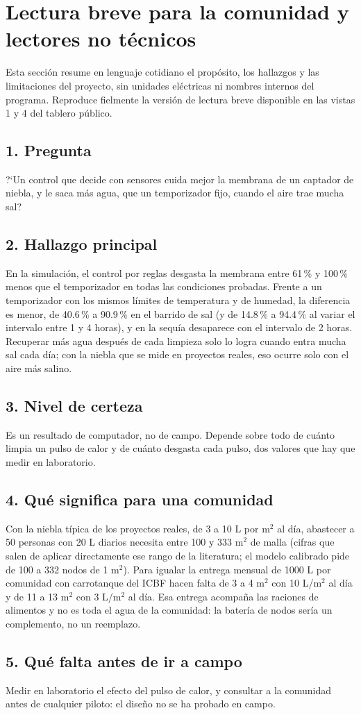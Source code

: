 \chapter*{Lectura breve para la comunidad y lectores no t\'ecnicos}

Esta secci\'on resume en lenguaje cotidiano el prop\'osito, los hallazgos y las limitaciones del proyecto, sin unidades el\'ectricas ni nombres internos del programa. Reproduce fielmente la versi\'on de lectura breve disponible en las vistas 1 y 4 del tablero p\'ublico.

\section*{1. Pregunta}
?`Un control que decide con sensores cuida mejor la membrana de un captador de niebla, y le saca m\'as agua, que un temporizador fijo, cuando el aire trae mucha sal?

\section*{2. Hallazgo principal}
En la simulaci\'on, el control por reglas desgasta la membrana entre 61\,\% y 100\,\% menos que el temporizador en todas las condiciones probadas. Frente a un temporizador con los mismos l\'imites de temperatura y de humedad, la diferencia es menor, de 40.6\,\% a 90.9\,\% en el barrido de sal (y de 14.8\,\% a 94.4\,\% al variar el intervalo entre 1 y 4 horas), y en la sequ\'ia desaparece con el intervalo de 2 horas. Recuperar m\'as agua despu\'es de cada limpieza solo lo logra cuando entra mucha sal cada d\'ia; con la niebla que se mide en proyectos reales, eso ocurre solo con el aire m\'as salino.

\section*{3. Nivel de certeza}
Es un resultado de computador, no de campo. Depende sobre todo de cu\'anto limpia un pulso de calor y de cu\'anto desgasta cada pulso, dos valores que hay que medir en laboratorio.

\section*{4. Qu\'e significa para una comunidad}
Con la niebla t\'ipica de los proyectos reales, de 3 a 10 L por m$^2$ al d\'ia, abastecer a 50 personas con 20 L diarios necesita entre 100 y 333 m$^2$ de malla (cifras que salen de aplicar directamente ese rango de la literatura; el modelo calibrado pide de 100 a 332 nodos de 1 m$^2$). Para igualar la entrega mensual de 1000 L por comunidad con carrotanque del ICBF hacen falta de 3 a 4 m$^2$ con 10 L/m$^2$ al d\'ia y de 11 a 13 m$^2$ con 3 L/m$^2$ al d\'ia. Esa entrega acompa\~na las raciones de alimentos y no es toda el agua de la comunidad: la bater\'ia de nodos ser\'ia un complemento, no un reemplazo.

\section*{5. Qu\'e falta antes de ir a campo}
Medir en laboratorio el efecto del pulso de calor, y consultar a la comunidad antes de cualquier piloto: el dise\~no no se ha probado en campo.

